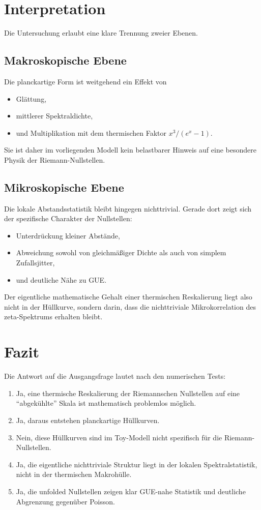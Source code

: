\documentclass[11pt,a4paper]{article}
\theoremstyle{definition}
\theoremstyle{remark}
\begin{document}
	\section{Interpretation}
	
	Die Untersuchung erlaubt eine klare Trennung zweier Ebenen.
	
	\subsection{Makroskopische Ebene}
	Die planckartige Form ist weitgehend ein Effekt von
	\begin{itemize}[leftmargin=1.5em]
		\item Glättung,
		\item mittlerer Spektraldichte,
		\item und Multiplikation mit dem thermischen Faktor $x^3/(e^x-1)$.
	\end{itemize}
	
	Sie ist daher im vorliegenden Modell kein belastbarer Hinweis auf eine besondere Physik der Riemann-Nullstellen.
	
	\subsection{Mikroskopische Ebene}
	Die lokale Abstandsstatistik bleibt hingegen nichttrivial. Gerade dort zeigt sich der spezifische Charakter der Nullstellen:
	\begin{itemize}[leftmargin=1.5em]
		\item Unterdrückung kleiner Abstände,
		\item Abweichung sowohl von gleichmäßiger Dichte als auch von simplem Zufallsjitter,
		\item und deutliche Nähe zu GUE.
	\end{itemize}
	
	Der eigentliche mathematische Gehalt einer thermischen Reskalierung liegt also nicht in der Hüllkurve, sondern darin, dass die nichttriviale Mikrokorrelation des zeta-Spektrums erhalten bleibt.
	
	\section{Fazit}
	
	Die Antwort auf die Ausgangsfrage lautet nach den numerischen Tests:
	\begin{enumerate}[leftmargin=1.5em]
		\item Ja, eine thermische Reskalierung der Riemannschen Nullstellen auf eine ``abgekühlte'' Skala ist mathematisch problemlos möglich.
		\item Ja, daraus entstehen planckartige Hüllkurven.
		\item Nein, diese Hüllkurven sind im Toy-Modell nicht spezifisch für die Riemann-Nullstellen.
		\item Ja, die eigentliche nichttriviale Struktur liegt in der lokalen Spektralstatistik, nicht in der thermischen Makrohülle.
		\item Ja, die unfolded Nullstellen zeigen klar GUE-nahe Statistik und deutliche Abgrenzung gegenüber Poisson.
	\end{enumerate}
	
\end{document}
